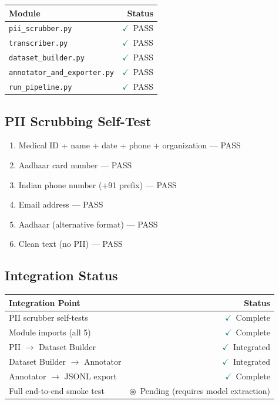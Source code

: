 \documentclass[11pt,a4paper]{article}
\begin{document}
\begin{tcolorbox}[successBox={Import Test Results}]
\begin{tabular}{lr}
\toprule
\textbf{Module} & \textbf{Status} \\
\midrule
\texttt{pii\_scrubber.py} & \textcolor{teal}{$\checkmark$}\ PASS \\
\texttt{transcriber.py} & \textcolor{teal}{$\checkmark$}\ PASS \\
\texttt{dataset\_builder.py} & \textcolor{teal}{$\checkmark$}\ PASS \\
\texttt{annotator\_and\_exporter.py} & \textcolor{teal}{$\checkmark$}\ PASS \\
\texttt{run\_pipeline.py} & \textcolor{teal}{$\checkmark$}\ PASS \\
\bottomrule
\end{tabular}
\end{tcolorbox}

\subsection{PII Scrubbing Self-Test}

\begin{tcolorbox}[successBox={Self-Test: 6/6 Passed}]
\begin{enumerate}[label=Test \arabic*:, leftmargin=*]
\item Medical ID + name + date + phone + organization --- PASS
\item Aadhaar card number --- PASS
\item Indian phone number (+91 prefix) --- PASS
\item Email address --- PASS
\item Aadhaar (alternative format) --- PASS
\item Clean text (no PII) --- PASS
\end{enumerate}
\end{tcolorbox}

\subsection{Integration Status}

\begin{center}
\begin{tabular}{lr}
\toprule
\textbf{Integration Point} & \textbf{Status} \\
\midrule
PII scrubber self-tests & \textcolor{teal}{$\checkmark$}\ Complete \\
Module imports (all 5) & \textcolor{teal}{$\checkmark$}\ Complete \\
PII $\to$ Dataset Builder & \textcolor{teal}{$\checkmark$}\ Integrated \\
Dataset Builder $\to$ Annotator & \textcolor{teal}{$\checkmark$}\ Integrated \\
Annotator $\to$ JSONL export & \textcolor{teal}{$\checkmark$}\ Complete \\
Full end-to-end smoke test & $\circledast$\ Pending (requires model extraction) \\
\bottomrule
\end{tabular}
\end{center}
\end{document}
